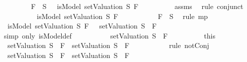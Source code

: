 \begin{isabellebody}
\ \ \ \ \ \ \isamarkupfalse%
\ {\isachardoublequoteopen}\isactrlbold {\isasymnot}\ F{}\ {\isasymin}\ S\ {\isasymlongrightarrow}\ {\isasymnot}\ isModel\ {\isacharparenleft}setValuation\ S{\isacharparenright}\ F{}{\isachardoublequoteclose}\isanewline
\ \ \ \ \ \ \ \ \isamarkupfalse%
\ assms{\isacharparenleft}{}{\isacharparenright}\ \isamarkupfalse%
\ {\isacharparenleft}rule\ conjunct{}{\isacharparenright}\isanewline
\ \ \ \ \ \ \isamarkupfalse%
\ \isamarkupfalse%
\ {\isachardoublequoteopen}{\isasymnot}\ isModel\ {\isacharparenleft}setValuation\ S{\isacharparenright}\ F{}{\isachardoublequoteclose}\isanewline
\ \ \ \ \ \ \ \ \isamarkupfalse%
\ {\isacartoucheopen}\isactrlbold {\isasymnot}\ F{}\ {\isasymin}\ S{\isacartoucheclose}\ \isamarkupfalse%
\ {\isacharparenleft}rule\ mp{\isacharparenright}\isanewline
\ \ \ \ \ \ \isamarkupfalse%
\ \isamarkupfalse%
\ {\isachardoublequoteopen}{\isacharparenleft}{\isasymnot}\ isModel\ {\isacharparenleft}setValuation\ S{\isacharparenright}\ F{}{\isacharparenright}\ {\isacharequal}\ {\isacharparenleft}{\isasymnot}\ {\isacharparenleft}setValuation\ S{\isacharparenright}\ {\isasymTurnstile}\ F{}{\isacharparenright}{\isachardoublequoteclose}\isanewline
\ \ \ \ \ \ \ \ \isamarkupfalse%
\ {\isacharparenleft}simp\ only{\isacharcolon}\ isModel{\isacharunderscore}def{\isacharparenright}\isanewline
\ \ \ \ \ \ \isamarkupfalse%
\ \isamarkupfalse%
\ {\isachardoublequoteopen}{\isasymnot}\ {\isacharparenleft}setValuation\ S{\isacharparenright}\ {\isasymTurnstile}\ F{}{\isachardoublequoteclose}\isanewline
\ \ \ \ \ \ \ \ \isamarkupfalse%
\ this\isanewline
\ \ \ \ \ \ \isamarkupfalse%
\ \isamarkupfalse%
\ {\isachardoublequoteopen}{\isasymnot}\ {\isacharparenleft}{\isacharparenleft}setValuation\ S{\isacharparenright}\ {\isasymTurnstile}\ F{}\ {\isasymand}\ {\isacharparenleft}setValuation\ S{\isacharparenright}\ {\isasymTurnstile}\ F{}{\isacharparenright}{\isachardoublequoteclose}\ \isanewline
\ \ \ \ \ \ \ \ \isamarkupfalse%
\ {\isacharparenleft}rule\ notConj{}{\isacharparenright}\isanewline
\ \ \ \ \ \ \isamarkupfalse%
\ \isamarkupfalse%
\ {\isachardoublequoteopen}{\isacharparenleft}{\isasymnot}\ {\isacharparenleft}{\isacharparenleft}setValuation\ S{\isacharparenright}\ {\isasymTurnstile}\ F{}\ {\isasymand}\ {\isacharparenleft}setValuation\ S{\isacharparenright}\ {\isasymTurnstile}\ F{}{\isacharparenright}{\isacharparenright}\ {\isacharequal}\ \isanewline

\end{isabellebody}
